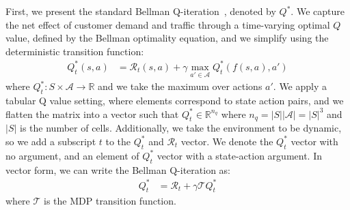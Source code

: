 \documentclass[journal]{IEEEtran}
\begin{document}
First, we present the standard Bellman Q-iteration~\cite{SuttonB98}, denoted by $Q^*$. We capture the net effect of customer demand and traffic through a time-varying optimal $Q$ value, defined by the Bellman optimality equation, and we simplify using the deterministic transition function: 
\begin{align*}
    Q^{*}_t(s,a) &= \mathcal{R}_t(s,a) + \gamma \max_{a' \in \mathcal{A}} Q^{*}_t(f(s,a),a')
\end{align*}
where $Q_t^*: S \times \mathcal{A} \rightarrow \mathbb{R}$ and we take the maximum over actions $a'$. We apply a tabular Q value setting, where elements correspond to state action pairs, and we flatten the matrix into a vector such that $Q^{*}_t \in \mathbb{R}^{n_q}$ where $n_q = |S| |\mathcal{A}| = |S|^3$ and $|S|$ is the number of cells. Additionally, we take the environment to be dynamic, so we add a subscript $t$ to the $Q^*_t$ and $\mathcal{R}_t$ vector. We denote the $Q^*_t$ vector with no argument, and an element of $Q^*_t$ vector with a state-action argument. In vector form, we can write the Bellman Q-iteration as:
\begin{align}
    \label{eq:bellman_q}
    Q^{*}_t &= \mathcal{R}_t + \gamma \mathcal{T} Q^*_t
\end{align}
where $\mathcal{T}$ is the MDP transition function. 
\end{document}
